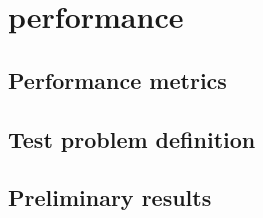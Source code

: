 \section{\celeritas performance}


\subsection{Performance metrics}

\subsection{Test problem definition}

\subsection{Preliminary results}
